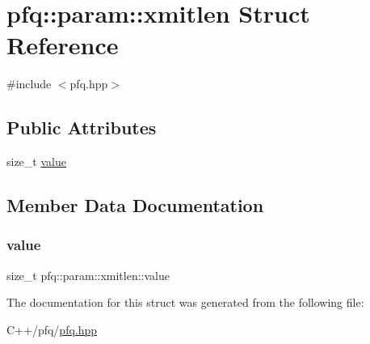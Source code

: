 \hypertarget{structpfq_1_1param_1_1xmitlen}{}\section{pfq\+:\+:param\+:\+:xmitlen Struct Reference}
\label{structpfq_1_1param_1_1xmitlen}


{\ttfamily \#include $<$pfq.\+hpp$>$}

\subsection*{Public Attributes}
\begin{DoxyCompactItemize}
\item 
size\+\_\+t \hyperlink{structpfq_1_1param_1_1xmitlen_a9c9c5952ea26d15ec5982d4312123d5c}{value}
\end{DoxyCompactItemize}


\subsection{Member Data Documentation}
\mbox{\label{structpfq_1_1param_1_1xmitlen_a9c9c5952ea26d15ec5982d4312123d5c}} 
\subsubsection{\texorpdfstring{value}{value}}
{\footnotesize\ttfamily size\+\_\+t pfq\+::param\+::xmitlen\+::value}



The documentation for this struct was generated from the following file\+:\begin{DoxyCompactItemize}
\item 
C++/pfq/\hyperlink{pfq_8hpp}{pfq.\+hpp}\end{DoxyCompactItemize}
